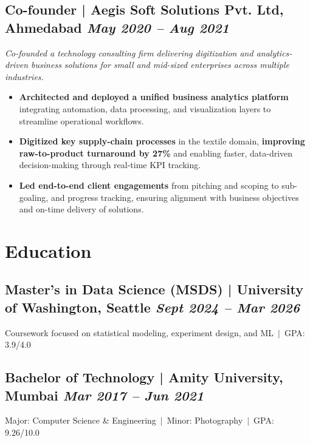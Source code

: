 \documentclass[10pt,a4paper]{article}
\begin{document}
\subsection{Co-founder | Aegis Soft Solutions Pvt. Ltd, Ahmedabad \hfill
\textit{May 2020 -- Aug 2021}}
\textit{Co-founded a technology consulting firm delivering digitization and analytics-driven business solutions for small and mid-sized enterprises across multiple industries.}
\begin{itemize}
    \item \textbf{Architected and deployed a unified business analytics platform} integrating automation, data processing, and visualization layers to streamline operational workflows.
    \item \textbf{Digitized key supply-chain processes} in the textile domain, \textbf{improving raw-to-product turnaround by 27\%} and enabling faster, data-driven decision-making through real-time KPI tracking.
    \item \textbf{Led end-to-end client engagements} from pitching and scoping to sub-goaling, and progress tracking, ensuring alignment with business objectives and on-time delivery of solutions.
\end{itemize}

\section*{Education}
\subsection{Master's in Data Science (MSDS) | University of Washington, Seattle \hfill
\textit{Sept 2024 -- Mar 2026}}
Coursework focused on statistical modeling, experiment design, and ML\ $|$\ GPA: 3.9/4.0

\subsection{Bachelor of Technology | Amity University, Mumbai \hfill
\textit{Mar 2017 -- Jun 2021}}
Major: Computer Science \& Engineering\ $|$\ Minor: Photography\ $|$\ GPA: 9.26/10.0

\end{document}
